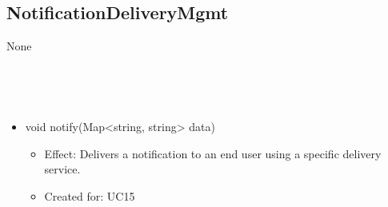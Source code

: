   \subsection{NotificationDeliveryMgmt}\label{int:NotificationDeliveryServiceNodeNotificationDeliveryServiceNotificationDeliveryMgmt}
    \begin{description}
      \item[Provided by:] None
      \item[Required by:] \iconcomponent{}~
      \item[Operations:] ~
    \begin{itemize}[noitemsep,nolistsep,leftmargin=-.25cm]
      \item \textsf{void notify(Map\textless{}string, string\textgreater{} data)}
        \begin{itemize}[noitemsep,nolistsep]
           \item Effect: Delivers a notification to an end user using a specific delivery service.
\item Created for: UC15
        \end{itemize}
    \end{itemize}
    \end{description}

